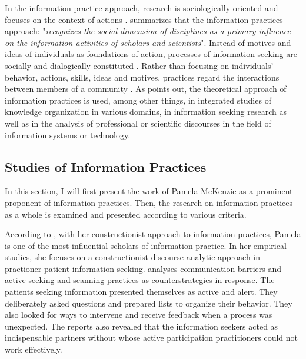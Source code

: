 \documentclass[12pt, a4paper, titlepage, oneside, abstract=true, toc=listof, toc=bibliography]{scrreprt}
\begin{document}
In the information practice approach, research is sociologically oriented and focuses on the context of actions \citep{Talja2005a}. \citet{Palmer2009} summarizes that the information practices approach: "\textit{recognizes the social dimension of disciplines as a primary influence on the information activities of scholars and scientists}". Instead of motives and ideas of individuals as foundations of action, processes of information seeking are socially and dialogically constituted \citep[p. 120]{Savolainen2007}. Rather than focusing on individuals' behavior, actions, skills, ideas and motives, practices regard the interactions between members of a community \citep{Tuominen2005}. As \citet[p. 93]{Talja2005} points out, the theoretical approach of information practices is used, among other things, in integrated studies of knowledge organization in various domains, in information seeking research as well as in the analysis of professional or scientific discourses in the field of information systems or technology. 


\subsection{Studies of Information Practices}
In this section, I will first present the work of Pamela McKenzie as a prominent proponent of information practices. Then, the research on information practices as a whole is examined and presented according to various criteria.

According to \citet[p. 121]{Savolainen2007}, with her constructionist approach to information practices, Pamela \citet{McKenzie2002, McKenzie2003, McKenzie2003a} is one of the most influential scholars of information practice. In her empirical studies, she focuses on a constructionist discourse analytic approach in practioner-patient information seeking. \citet{McKenzie2002} analyses communication barriers and active seeking and scanning practices as counterstrategies in response. The patients seeking information presented themselves as active and alert. They deliberately asked questions and prepared lists to organize their behavior. They also looked for ways to intervene and receive feedback when a process was unexpected. The reports also revealed that the information seekers acted as indispensable partners without whose active participation practitioners could not work effectively.
\end{document}
